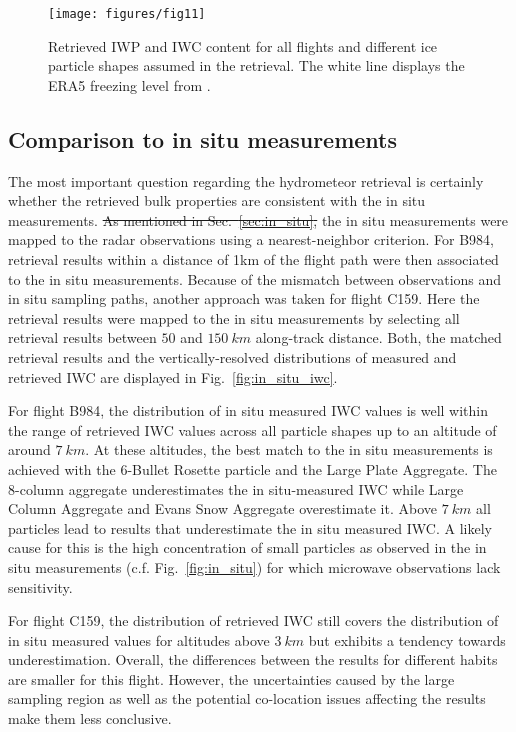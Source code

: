 \documentclass[journal abbreviation, manuscript]{copernicus}
\providecommand{\DIFadd}[1]{{\protect\color{blue}\uwave{#1}}} %
\providecommand{\DIFdel}[1]{{\protect\color{red}\sout{#1}}}                      %
\providecommand{\DIFaddbegin}{} %
\providecommand{\DIFaddend}{} %
\providecommand{\DIFdelbegin}{} %
\providecommand{\DIFdelend}{} %
\begin{document}
\begin{figure}[!hbpt]
  \centering
  \texttt{[image: figures/fig11]}
  \caption{Retrieved IWP and IWC content for all flights and different ice
    particle shapes assumed in the retrieval. The white line displays the ERA5
    freezing level from \citet{era5}.
  }
  \label{fig:ice_water_content}
\end{figure}

\subsection{Comparison to in situ measurements}

The most important question regarding the hydrometeor retrieval is certainly
whether the retrieved bulk properties are consistent with the in situ
measurements. \DIFdelbegin \DIFdel{As mentioned in Sec.~\ref{sec:in_situ}, }\DIFdelend \DIFaddbegin \DIFadd{To compare }\DIFaddend the in situ measurements \DIFaddbegin \DIFadd{to the retrieval results, they
}\DIFaddend were mapped to the radar observations using a nearest-neighbor criterion. For
B984, retrieval results within a distance of 1km of the flight path were then
associated to the in situ measurements. Because of the mismatch between
observations and in situ sampling paths, another approach was taken for flight
C159. Here the retrieval results were mapped to the in situ measurements by
selecting all retrieval results between $50$ and $150\ \unit{km}$ along-track
distance. Both, the matched retrieval results and the vertically-resolved
distributions of measured and retrieved IWC are displayed in
Fig.~\ref{fig:in_situ_iwc}.

For flight B984, the distribution of in situ measured IWC values is well within
the range of retrieved IWC values across all particle shapes up to an altitude
of around $7\ \unit{km}$. At these altitudes, the best match to the in situ
measurements is achieved with the 6-Bullet Rosette particle and the Large Plate
Aggregate. The 8-column aggregate underestimates the in situ-measured IWC while
Large Column Aggregate and Evans Snow Aggregate overestimate it. Above
$7\ \unit{km}$ all particles lead to results that underestimate the in situ
measured IWC. A likely cause for this is the high concentration of small
particles as observed in the in situ measurements (c.f. Fig.~\ref{fig:in_situ})
for which microwave observations lack sensitivity.

For flight C159, the distribution of retrieved IWC still covers the distribution
of in situ measured values for altitudes above $3\ \unit{km}$ but exhibits a
tendency towards underestimation. Overall, the differences between the results
for different habits are smaller for this flight. However, the uncertainties
caused by the large sampling region as well as the potential co-location issues
affecting the results make them less conclusive.
\end{document}
